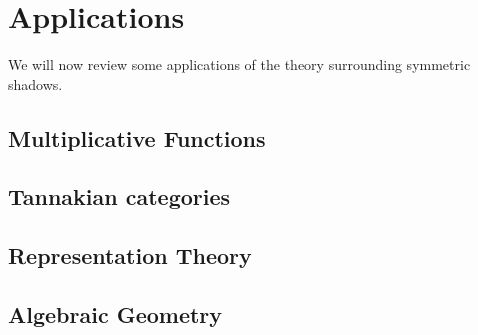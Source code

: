 \section{Applications}

We will now review some applications of the theory surrounding symmetric shadows.

\subsection{Multiplicative Functions}

\subsection{Tannakian categories}

\subsection{Representation Theory}

\subsection{Algebraic Geometry}

